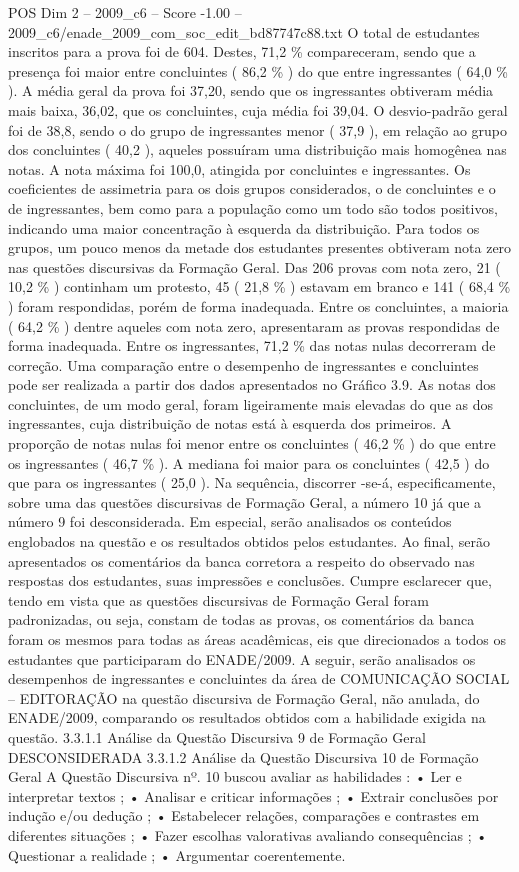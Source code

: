 \begin{textsample}{POS Dim 2 – 2009\_c6 – Score -1.00 – 2009\_c6/enade\_2009\_com\_soc\_edit\_bd87747c88.txt}
O total de estudantes inscritos para a prova foi de 604.
Destes, 71,2 \% compareceram, sendo que a presença foi maior entre concluintes ( 86,2 \% ) do que entre ingressantes ( 64,0 \% ).
A média geral da prova foi 37,20, sendo que os ingressantes obtiveram média mais baixa, 36,02, que os concluintes, cuja média foi 39,04.
O desvio-padrão geral foi de 38,8, sendo o do grupo de ingressantes menor ( 37,9 ), em relação ao grupo dos concluintes ( 40,2 ), aqueles possuíram uma distribuição mais homogênea nas notas.
A nota máxima foi 100,0, atingida por concluintes e ingressantes.
Os coeficientes de assimetria para os dois grupos considerados, o de concluintes e o de ingressantes, bem como para a população como um todo são todos positivos, indicando uma maior concentração à esquerda da distribuição.
Para todos os grupos, um pouco menos da metade dos estudantes presentes obtiveram nota zero nas questões discursivas da Formação Geral.
Das 206 provas com nota zero, 21 ( 10,2 \% ) continham um protesto, 45 ( 21,8 \% ) estavam em branco e 141 ( 68,4 \% ) foram respondidas, porém de forma inadequada.
Entre os concluintes, a maioria ( 64,2 \% ) dentre aqueles com nota zero, apresentaram as provas respondidas de forma inadequada.
Entre os ingressantes, 71,2 \% das notas nulas decorreram de correção.
Uma comparação entre o desempenho de ingressantes e concluintes pode ser realizada a partir dos dados apresentados no Gráfico 3.9.
As notas dos concluintes, de um modo geral, foram ligeiramente mais elevadas do que as dos ingressantes, cuja distribuição de notas está à esquerda dos primeiros.
A proporção de notas nulas foi menor entre os concluintes ( 46,2 \% ) do que entre os ingressantes ( 46,7 \% ).
A mediana foi maior para os concluintes ( 42,5 ) do que para os ingressantes ( 25,0 ).
Na sequência, discorrer -se-á, especificamente, sobre uma das questões discursivas de Formação Geral, a número 10 já que a número 9 foi desconsiderada.
Em especial, serão analisados os conteúdos englobados na questão e os resultados obtidos pelos estudantes.
Ao final, serão apresentados os comentários da banca corretora a respeito do observado nas respostas dos estudantes, suas impressões e conclusões.
Cumpre esclarecer que, tendo em vista que as questões discursivas de Formação Geral foram padronizadas, ou seja, constam de todas as provas, os comentários da banca foram os mesmos para todas as áreas acadêmicas, eis que direcionados a todos os estudantes que participaram do ENADE/2009.
A seguir, serão analisados os desempenhos de ingressantes e concluintes da área de COMUNICAÇÃO SOCIAL – EDITORAÇÃO na questão discursiva de Formação Geral, não anulada, do ENADE/2009, comparando os resultados obtidos com a habilidade exigida na questão. 3.3.1.1 Análise da Questão Discursiva 9 de Formação Geral DESCONSIDERADA 3.3.1.2 Análise da Questão Discursiva 10 de Formação Geral A Questão Discursiva nº. 10 buscou avaliar as habilidades : • Ler e interpretar textos ; • Analisar e criticar informações ; • Extrair conclusões por indução e/ou dedução ; • Estabelecer relações, comparações e contrastes em diferentes situações ; • Fazer escolhas valorativas avaliando consequências ; • Questionar a realidade ; • Argumentar coerentemente.

\end{textsample}
